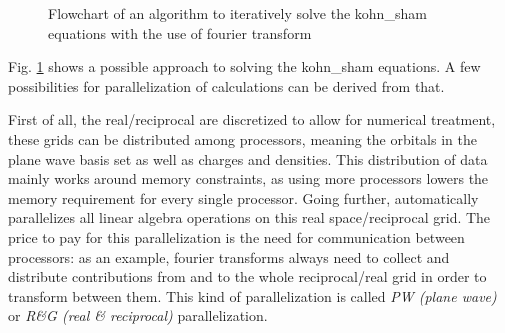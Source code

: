 \documentclass[main.tex]{subfiles}
\begin{document}
\begin{figure}[ht!]
{}
\label{fig:diagram_scf_calculations}
\caption{Flowchart of an algorithm to iteratively solve the \acrshort{kohn_sham} equations with the use of fourier transform}
\end{figure}

Fig. \ref{fig:diagram_scf_calculations} shows a possible approach to solving the \acrshort{kohn_sham} equations.
A few possibilities for parallelization of calculations can be derived from that.

First of all, the real/reciprocal are discretized to allow for numerical treatment, these grids can be distributed among processors, meaning the orbitals in the plane wave basis set as well as charges and densities.
This distribution of data mainly works around memory constraints, as using more processors lowers the memory requirement for every single processor.
Going further, \QE automatically parallelizes all linear algebra operations on this real space/reciprocal grid.
The price to pay for this parallelization is the need for communication between processors: as an example, fourier transforms always need to collect and distribute contributions from and to the whole reciprocal/real grid in order to transform between them.
This kind of parallelization is called \emph{PW (plane wave)} or \emph{R\&G (real \& reciprocal)} parallelization. 
\end{document}
